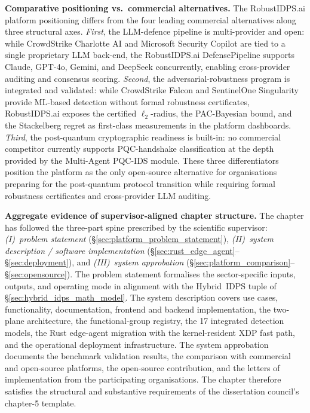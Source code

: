 \noindent\textbf{Comparative positioning vs.\ commercial alternatives.} The \textsf{RobustIDPS.ai} platform positioning differs from the four leading commercial alternatives along three structural axes. \emph{First}, the LLM-defence pipeline is multi-provider and open: while CrowdStrike Charlotte AI and Microsoft Security Copilot are tied to a single proprietary LLM back-end, the RobustIDPS.ai DefensePipeline supports Claude, GPT-4o, Gemini, and DeepSeek concurrently, enabling cross-provider auditing and consensus scoring. \emph{Second}, the adversarial-robustness program is integrated and validated: while CrowdStrike Falcon and SentinelOne Singularity provide ML-based detection without formal robustness certificates, RobustIDPS.ai exposes the certified $\ell_2$-radius, the PAC-Bayesian bound, and the Stackelberg regret as first-class measurements in the platform dashboards. \emph{Third}, the post-quantum cryptographic readiness is built-in: no commercial competitor currently supports PQC-handshake classification at the depth provided by the Multi-Agent PQC-IDS module. These three differentiators position the platform as the only open-source alternative for organisations preparing for the post-quantum protocol transition while requiring formal robustness certificates and cross-provider LLM auditing.

\noindent\textbf{Aggregate evidence of supervisor-aligned chapter structure.} The chapter has followed the three-part spine prescribed by the scientific supervisor: \emph{(I)~problem statement} (\S\ref{sec:platform_problem_statement}), \emph{(II)~system description / software implementation} (\S\ref{sec:rust_edge_agent}--\S\ref{sec:deployment}), and \emph{(III)~system approbation} (\S\ref{sec:platform_comparison}--\S\ref{sec:opensource}). The problem statement formalises the sector-specific inputs, outputs, and operating mode in alignment with the Hybrid~IDPS tuple of \S\ref{sec:hybrid_idps_math_model}. The system description covers use cases, functionality, documentation, frontend and backend implementation, the two-plane architecture, the functional-group registry, the 17 integrated detection models, the Rust edge-agent migration with the kernel-resident XDP fast path, and the operational deployment infrastructure. The system approbation documents the benchmark validation results, the comparison with commercial and open-source platforms, the open-source contribution, and the letters of implementation from the participating organisations. The chapter therefore satisfies the structural and substantive requirements of the dissertation council's chapter-5 template.

